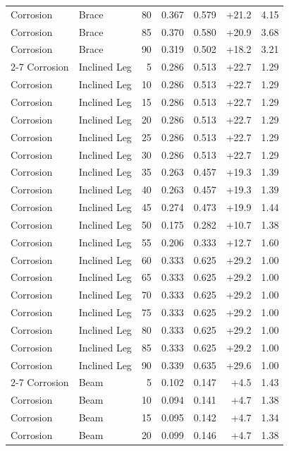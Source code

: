 \begin{longtable}{llrrrrr}
    Corrosion & Brace & 80 & 0.367 & 0.579 & +21.2 & 4.15 \\
    Corrosion & Brace & 85 & 0.370 & 0.580 & +20.9 & 3.68 \\
    Corrosion & Brace & 90 & 0.319 & 0.502 & +18.2 & 3.21 \\
    \cmidrule{2-7}
    Corrosion & Inclined Leg & 5 & 0.286 & 0.513 & +22.7 & 1.29 \\
    Corrosion & Inclined Leg & 10 & 0.286 & 0.513 & +22.7 & 1.29 \\
    Corrosion & Inclined Leg & 15 & 0.286 & 0.513 & +22.7 & 1.29 \\
    Corrosion & Inclined Leg & 20 & 0.286 & 0.513 & +22.7 & 1.29 \\
    Corrosion & Inclined Leg & 25 & 0.286 & 0.513 & +22.7 & 1.29 \\
    Corrosion & Inclined Leg & 30 & 0.286 & 0.513 & +22.7 & 1.29 \\
    Corrosion & Inclined Leg & 35 & 0.263 & 0.457 & +19.3 & 1.39 \\
    Corrosion & Inclined Leg & 40 & 0.263 & 0.457 & +19.3 & 1.39 \\
    Corrosion & Inclined Leg & 45 & 0.274 & 0.473 & +19.9 & 1.44 \\
    Corrosion & Inclined Leg & 50 & 0.175 & 0.282 & +10.7 & 1.38 \\
    Corrosion & Inclined Leg & 55 & 0.206 & 0.333 & +12.7 & 1.60 \\
    Corrosion & Inclined Leg & 60 & 0.333 & 0.625 & +29.2 & 1.00 \\
    Corrosion & Inclined Leg & 65 & 0.333 & 0.625 & +29.2 & 1.00 \\
    Corrosion & Inclined Leg & 70 & 0.333 & 0.625 & +29.2 & 1.00 \\
    Corrosion & Inclined Leg & 75 & 0.333 & 0.625 & +29.2 & 1.00 \\
    Corrosion & Inclined Leg & 80 & 0.333 & 0.625 & +29.2 & 1.00 \\
    Corrosion & Inclined Leg & 85 & 0.333 & 0.625 & +29.2 & 1.00 \\
    Corrosion & Inclined Leg & 90 & 0.339 & 0.635 & +29.6 & 1.00 \\
    \cmidrule{2-7}
    Corrosion & Beam & 5 & 0.102 & 0.147 & +4.5 & 1.43 \\
    Corrosion & Beam & 10 & 0.094 & 0.141 & +4.7 & 1.38 \\
    Corrosion & Beam & 15 & 0.095 & 0.142 & +4.7 & 1.34 \\
    Corrosion & Beam & 20 & 0.099 & 0.146 & +4.7 & 1.38 \\

\end{longtable}
